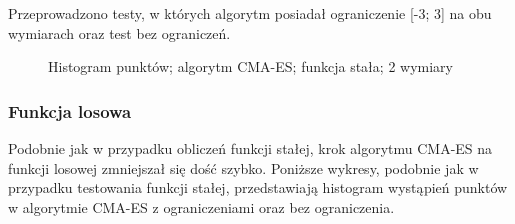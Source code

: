 \documentclass{mini}
\begin{document}
Przeprowadzono testy, w których algorytm posiadał ograniczenie [-3; 3] na obu wymiarach oraz test bez ograniczeń.

\begin{figure}[H]
\centering
{}
\quad
{}
\caption{Histogram punktów; algorytm CMA-ES; funkcja stała; 2 wymiary}
\end{figure}

\subsubsection*{Funkcja losowa}
Podobnie jak w przypadku obliczeń funkcji stałej, krok algorytmu CMA-ES na funkcji losowej zmniejszał się dość szybko. Poniższe wykresy, podobnie jak w przypadku testowania funkcji stałej, przedstawiają histogram wystąpień punktów w algorytmie CMA-ES z ograniczeniami oraz bez ograniczenia.
\end{document}
